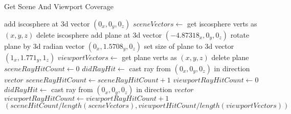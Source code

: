 ﻿\documentclass[a4paper]{article}
\begin{document}
    \begin{algorithm}
        \caption{Get Scene And Viewport Coverage}\label{alg:cap}
        \begin{algorithmic}[1]
            \State add iscosphere at 3d vector $(0_x,0_y,0_z)$
            \State $sceneVectors \gets$ get iscosphere verts as $(x,y,z)$
            \State delete iscosphere
            \State
            \State add plane at 3d vector $(-4.87318_x,0_y,0_z)$
            \State rotate plane by 3d radian vector $(0_x,1.5708_y,0_z)$
            \State set size of plane to 3d vector $(1_x,1.771_y,1_z)$
            \State $viewportVectors \gets$ get plane verts as $(x,y,z)$
            \State delete plane
            \State
            \State $sceneRayHitCount \gets 0$
                \State $didRayHit \gets$ cast ray from $(0_x,0_y,0_z)$ in direction $vector$
                    \State $sceneRayHitCount \gets sceneRayHitCount+1$
                \EndIf
            \EndFor
            \State
            \State $viewportRayHitCount \gets 0$
                \State $didRayHit \gets$ cast ray from $(0_x,0_y,0_z)$ in direction $vector$
                    \State $viewportRayHitCount \gets viewportRayHitCount+1$
                \EndIf
            \EndFor
            \State
            \Return $(sceneHitCount/length(sceneVectors),viewportHitCount/length(viewportVectors))$
        \end{algorithmic}
    \end{algorithm}
\end{document}
